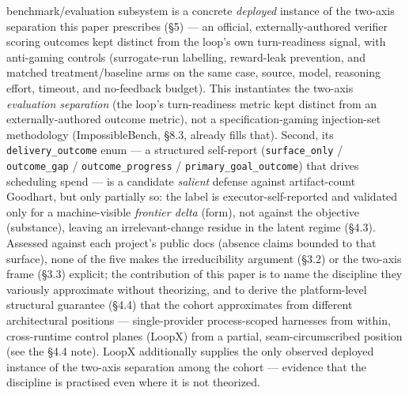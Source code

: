 \documentclass[
  11pt,
]{article}
\begin{document}
benchmark/evaluation subsystem is a concrete \emph{deployed} instance of
the two-axis separation this paper prescribes (§5) --- an official,
externally-authored verifier scoring outcomes kept distinct from the
loop's own turn-readiness signal, with anti-gaming controls
(surrogate-run labelling, reward-leak prevention, and matched
treatment/baseline arms on the same case, source, model, reasoning
effort, timeout, and no-feedback budget). This instantiates the two-axis
\emph{evaluation separation} (the loop's turn-readiness metric kept
distinct from an externally-authored outcome metric), not a
specification-gaming injection-set methodology (ImpossibleBench, §8.3,
already fills that). Second, its \texttt{delivery\_outcome} enum --- a
structured self-report (\texttt{surface\_only} / \texttt{outcome\_gap} /
\texttt{outcome\_progress} / \texttt{primary\_goal\_outcome}) that
drives scheduling spend --- is a candidate \emph{salient} defense
against artifact-count Goodhart, but only partially so: the label is
executor-self-reported and validated only for a machine-visible
\emph{frontier delta} (form), not against the objective (substance),
leaving an irrelevant-change residue in the latent regime (§4.3).
Assessed against each project's public docs (absence claims bounded to
that surface), none of the five makes the irreducibility argument (§3.2)
or the two-axis frame (§3.3) explicit; the contribution of this paper is
to name the discipline they variously approximate without theorizing,
and to derive the platform-level structural guarantee (§4.4) that the
cohort approximates from different architectural positions ---
single-provider process-scoped harnesses from within, cross-runtime
control planes (LoopX) from a partial, seam-circumscribed position (see
the §4.4 note). LoopX additionally supplies the only observed deployed
instance of the two-axis separation among the cohort --- evidence that
the discipline is practised even where it is not theorized.
\end{document}
